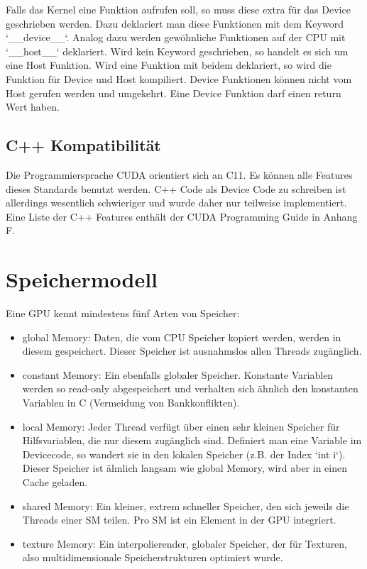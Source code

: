 			Falls das \Gls{Kernel} eine Funktion aufrufen soll, so muss diese extra für das Device geschrieben werden. Dazu deklariert man diese Funktionen mit dem Keyword \li`__device__`. Analog dazu werden gewöhnliche Funktionen auf der CPU mit \li`__host__` deklariert. Wird kein Keyword geschrieben, so handelt es sich um eine Host Funktion. Wird eine Funktion mit beidem deklariert, so wird die Funktion für Device und Host kompiliert. Device Funktionen können nicht vom Host gerufen werden und umgekehrt. Eine Device Funktion darf einen return Wert haben.
			
			\subsection*{C++ Kompatibilit\"at}
			Die Programmiersprache CUDA orientiert sich an C11. Es können alle Features dieses Standards benutzt werden. C++ Code als Device Code zu schreiben ist allerdings wesentlich schwieriger und wurde daher nur teilweise implementiert. Eine Liste der C++ Features enthält der CUDA Programming Guide in Anhang F. \autocite{cudaPG} 
			
			
		\section{Speichermodell}
		Eine GPU kennt mindestens fünf Arten von Speicher:
		\begin{itemize}
			\item \Gls{global Memory}: Daten, die vom CPU Speicher kopiert werden, werden in diesem gespeichert. Dieser Speicher ist ausnahmslos allen \Glspl{Thread} zugänglich.
			\item \Gls{constant Memory}: Ein ebenfalls globaler Speicher. Konstante Variablen werden so read-only abgespeichert und verhalten sich ähnlich den konstanten Variablen in C (Vermeidung von Bankkonflikten).
			\item \Gls{local Memory}: Jeder \Gls{Thread} verfügt über einen sehr kleinen Speicher für Hilfsvariablen, die nur diesem zugänglich sind. Definiert man eine Variable im Devicecode, so wandert sie in den lokalen Speicher (z.B. der Index \li`int i`). Dieser Speicher ist ähnlich langsam wie \gls{global Memory}, wird aber in einen Cache geladen.
			\item \Gls{shared Memory}: Ein kleiner, extrem schneller Speicher, den sich jeweils die \Glspl{Thread} einer \Gls{SM} teilen. Pro \Gls{SM} ist ein Element in der GPU integriert.
			\item \Gls{texture Memory}: Ein interpolierender, globaler Speicher, der für Texturen, also multidimensionale Speicherstrukturen optimiert wurde.
		\end{itemize}
		
